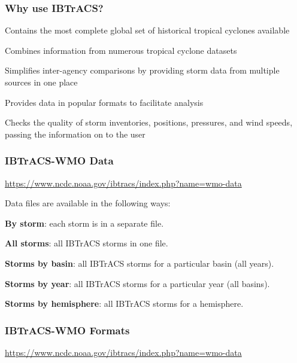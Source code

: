 \documentclass[12pt]{beamer}\usepackage[]{graphicx}\usepackage[]{color}
\begin{document}

\begin{frame}
\frametitle{Why use IBTrACS?}

\bbi
  \item Contains the most complete global set of historical tropical cyclones available
  \item Combines information from numerous tropical cyclone datasets
  \item Simplifies inter-agency comparisons by providing storm data from multiple sources in one place
  \item Provides data in popular formats to facilitate analysis
  \item Checks the quality of storm inventories, positions, pressures, and wind speeds, passing the information on to the user
\ei

\end{frame}


\begin{frame}
\frametitle{IBTrACS-WMO Data}

{\scriptsize \url{https://www.ncdc.noaa.gov/ibtracs/index.php?name=wmo-data}}

\bigskip
Data files are available in the following ways:
\bi
  \item \textbf{By storm}: each storm is in a separate file.
  \item \textbf{All storms}: all IBTrACS storms in one file.
  \item \textbf{Storms by basin}: all IBTrACS storms for a particular basin (all years).
  \item \textbf{Storms by year}: all IBTrACS storms for a particular year (all basins).
  \item \textbf{Storms by hemisphere}: all IBTrACS storms for a hemisphere.
\ei

\end{frame}


\begin{frame}
\frametitle{IBTrACS-WMO Formats}
{\scriptsize \url{https://www.ncdc.noaa.gov/ibtracs/index.php?name=wmo-data}}

\bigskip
\begin{center}
\end{center}
\end{frame}
\end{document}
